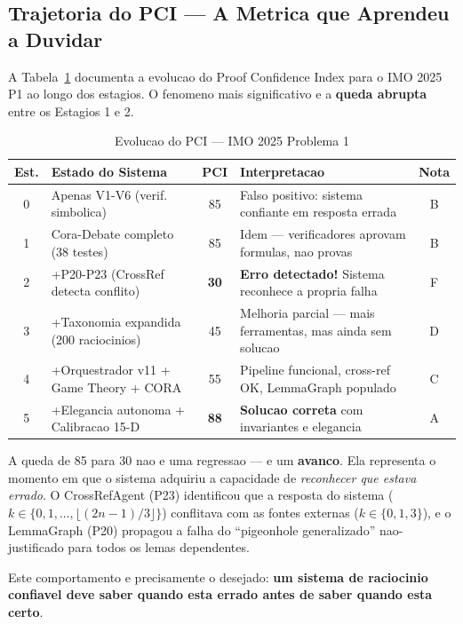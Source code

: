 \documentclass[5p]{elsarticle}
\begin{document}
\subsection{Trajetoria do PCI — A Metrica que Aprendeu a Duvidar}

A Tabela~\ref{tab:pcitrajectory} documenta a evolucao do Proof Confidence
Index para o IMO 2025 P1 ao longo dos estagios. O fenomeno mais significativo
e a \textbf{queda abrupta} entre os Estagios 1 e 2.

\begin{table}[H]
  \centering
  \caption{Evolucao do PCI — IMO 2025 Problema 1}
  \label{tab:pcitrajectory}
  \small
  \begin{tabular}{clcp{4cm}c}
    \toprule
    \textbf{Est.} & \textbf{Estado do Sistema} & \textbf{PCI} & \textbf{Interpretacao} & \textbf{Nota} \\
    \midrule
    0 & Apenas V1-V6 (verif. simbolica) & 85 & Falso positivo: sistema confiante em resposta errada & B \\
    1 & Cora-Debate completo (38 testes) & 85 & Idem --- verificadores aprovam formulas, nao provas & B \\
    \rowcolor{redbg}
    2 & +P20-P23 (CrossRef detecta conflito) & \textbf{30} & \textbf{Erro detectado!} Sistema reconhece a propria falha & F \\
    3 & +Taxonomia expandida (200 raciocinios) & 45 & Melhoria parcial --- mais ferramentas, mas ainda sem solucao & D \\
    \rowcolor{yellowbg}
    4 & +Orquestrador v11 + Game Theory + CORA & 55 & Pipeline funcional, cross-ref OK, LemmaGraph populado & C \\
    \rowcolor{greenbg}
    5 & +Elegancia autonoma + Calibracao 15-D & \textbf{88} & \textbf{Solucao correta} com invariantes e elegancia & A \\
    \bottomrule
  \end{tabular}
\end{table}

A queda de 85 para 30 nao e uma regressao --- e um \textbf{avanco}. Ela
representa o momento em que o sistema adquiriu a capacidade de \textit{reconhecer
que estava errado}. O CrossRefAgent (P23) identificou que a resposta do sistema
($k\in\{0,1,\dots,\lfloor(2n-1)/3\rfloor\}$) conflitava com as fontes externas
($k\in\{0,1,3\}$), e o LemmaGraph (P20) propagou a falha do ``pigeonhole
generalizado'' nao-justificado para todos os lemas dependentes.

Este comportamento e precisamente o desejado: \textbf{um sistema de raciocinio
confiavel deve saber quando esta errado antes de saber quando esta certo}.
\end{document}
